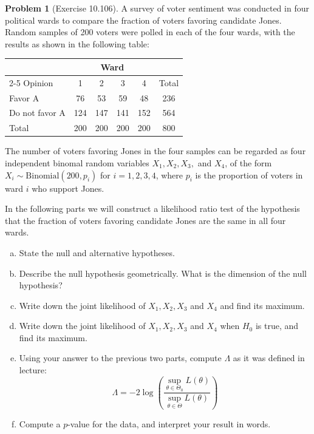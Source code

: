 \documentclass[10pt]{article}
\theoremstyle{definition}
\newtheorem{problem}[theorem]{Problem}
\newcommand{\1}[1]{\textbf{1}_{\left[#1\right]}} %
\begin{document}
\begin{problem}[Exercise 10.106]
  A survey of voter sentiment was conducted in four political wards to compare
  the fraction of voters favoring candidate Jones. Random samples of 200
  voters were polled in each of the four wards, with the results as shown in
  the following table:
  \begin{center}
    \begin{tabular}{lccccc}
      & \multicolumn{4}{c}{Ward} & \\
      \cline{2-5}
      Opinion & 1 & 2 & 3 & 4 & Total \\
      \hline
      Favor A & 76 & 53 & 59 & 48 & 236 \\
      Do not favor A & 124 & 147 & 141 & 152 & 564 \\
      \hline
      Total & 200 & 200 & 200 & 200 & 800 \\
    \end{tabular}
  \end{center}
  The number of voters favoring Jones in the four samples can be regarded as
  four independent binomal random variables $X_{1},X_{2},X_{3},$ and $X_{4}$,
  of the form $X_{i}\sim \text{Binomial}(200,p_{i})$ for $i=1,2,3,4$, where
  $p_{i}$ is the proportion of voters in ward $i$ who support Jones.
  
  In the following parts we will construct a likelihood ratio test of the
  hypothesis that the fraction of voters favoring candidate Jones are the same
  in all four wards.
  \begin{enumerate}[(a)]
    \item State the null and alternative hypotheses.
    \item Describe the null hypothesis geometrically. What is the dimension of
    the null hypothesis?
    \item Write down the joint likelihood of $X_{1},X_{2},X_{3}$ and $X_{4}$
    and find its maximum.
    \item Write down the joint likelihood of $X_{1},X_{2},X_{3}$ and $X_{4}$
    when $H_{0}$ is true, and find its maximum.
    \item Using your answer to the previous two parts, compute $\Lambda$ as it
    was defined in lecture:
    \begin{equation*}
      \Lambda 
      = -2\log\left( \frac{\sup_{\theta\in \Theta_{0}}L(\theta)}
        {\sup_{\theta\in \Theta}L(\theta)}  \right) 
    \end{equation*}
    \item Compute a $p$-value for the data, and interpret your result in
    words.
  \end{enumerate}
\end{problem}
\end{document}
